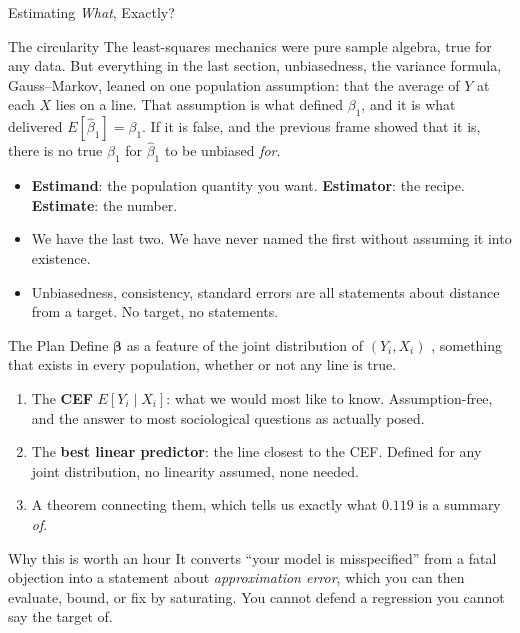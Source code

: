 \documentclass[aspectratio=169,11pt,xcolor=dvipsnames]{beamer}
\newcommand{\E}{E}
\begin{document}
\begin{frame}{Estimating \emph{What}, Exactly?}
\begin{block}{The circularity}
The least-squares mechanics were pure sample algebra, true for any data. But
everything in the last section, unbiasedness, the variance formula,
Gauss--Markov, leaned on one population assumption: that the average of $Y$
at each $X$ lies on a line. That assumption is what defined $\beta_1$, and it
is what delivered $\E[\hat\beta_1] = \beta_1$. If it is false, and the
previous frame showed that it is, there is no true $\beta_1$ for
$\hat\beta_1$ to be unbiased \emph{for}.
\end{block}
\vskip3pt
\begin{itemize}\itemsep3pt
  \item \textbf{Estimand}: the population quantity you want. \quad
        \textbf{Estimator}: the recipe. \quad
        \textbf{Estimate}: the number.
  \item We have the last two. We have never named the first without assuming it
        into existence.
  \item Unbiasedness, consistency, standard errors are \alert{all statements
        about distance from a target.} No target, no statements.
\end{itemize}
\end{frame}

\begin{frame}{The Plan}
Define $\bm\beta$ as a feature of the \alert{joint distribution of $(Y_i, X_i)$}
, something that exists in every population, whether or not any line is true.
\vskip6pt
\begin{enumerate}\itemsep5pt
  \item The \textbf{CEF} $\E[Y_i\mid X_i]$: what we would most like to know.
        Assumption-free, and the answer to most sociological questions as
        actually posed.
  \item The \textbf{best linear predictor}: the line closest to the CEF. Defined
        for any joint distribution, no linearity assumed, none needed.
  \item A theorem connecting them, which tells us exactly what $0.119$ is a
        summary \emph{of}.
\end{enumerate}
\vskip6pt
\begin{alertblock}{Why this is worth an hour}
It converts ``your model is misspecified'' from a fatal objection into a
statement about \emph{approximation error}, which you can then evaluate,
bound, or fix by saturating. You cannot defend a regression you cannot say the
target of.
\end{alertblock}
\end{frame}
\end{document}
